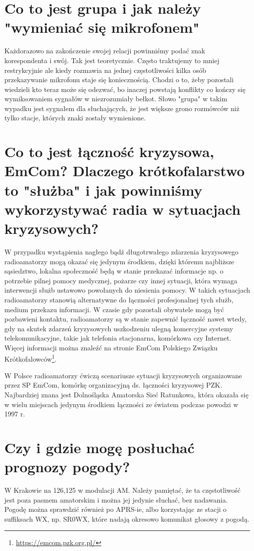 \documentclass[a4paper,12pt]{article}
\begin{document}
\section{Co to jest grupa i jak należy "wymieniać się mikrofonem"}
Każdorazowo na zakończenie swojej relacji powinniśmy podać znak korespondenta i swój. Tak jest teoretycznie. Często traktujemy to mniej restrykcyjnie ale kiedy rozmawia na jednej częstotliwości kilka osób przekazywanie mikrofonu staje się koniecznością. Chodzi o to, żeby pozostali wiedzieli kto teraz może się odezwać, bo inaczej powstają konflikty co kończy się wymiksowaniem sygnałów w niezrozumiały bełkot. Słowo "grupa" w takim wypadku jest sygnałem dla słuchających, że jest większe grono rozmówców niż tylko stacje, których znaki zostały wymienione.

\section{Co to jest łączność kryzysowa, EmCom? Dlaczego krótkofalarstwo to "służba" i jak powinniśmy wykorzystywać radia w sytuacjach kryzysowych?}
W przypadku wystąpienia nagłego bądź długotrwałego zdarzenia kryzysowego radioamatorzy mogą okazać się jedynym środkiem, dzięki któremu najbliższe sąsiedztwo, lokalna społeczność będą w stanie przekazać informacje np. o potrzebie pilnej pomocy medycznej, pożarze czy innej sytuacji, która wymaga interwencji służb ustawowo powołanych do niesienia pomocy. W takich sytuacjach radioamatorzy stanowią alternatywne do łączności profesjonalnej tych służb, medium przekazu informacji. W czasie gdy pozostali obywatele mogą być pozbawieni kontaktu, radioamatorzy są w stanie zapewnić łączność nawet wtedy, gdy na skutek zdarzeń kryzysowych uszkodzeniu ulegną komercyjne systemy telekomunikacyjne, takie jak telefonia stacjonarna, komórkowa czy Internet. Więcej informacji można znaleźć na stronie EmCom Polskiego Związku Krótkofalowców\footnote{\url{https://emcom.pzk.org.pl/}}.

W Polsce radioamatorzy ćwiczą scenariusze sytuacji kryzysowych organizowane przez SP EmCom, komórkę organizacyjną ds. łączności kryzysowej PZK. Najbardziej znana jest Dolnośląska Amatorska Sieć Ratunkowa, która okazała się w wielu miejscach jedynym środkiem łączności ze światem podczas powodzi w 1997 r.

\section{Czy i gdzie mogę posłuchać prognozy pogody?}
W Krakowie na 126,125 w modulacji AM. Należy pamiętać, że ta częstotliwość jest poza pasmem amatorskim i można jej jedynie słuchać, bez nadawania.
Pogodę można sprawdzić również po APRS-ie, albo korzystając ze stacji o suffiksach WX, np. SR0WX, które nadają okresowo komunikat głosowy z pogodą.
\end{document}

